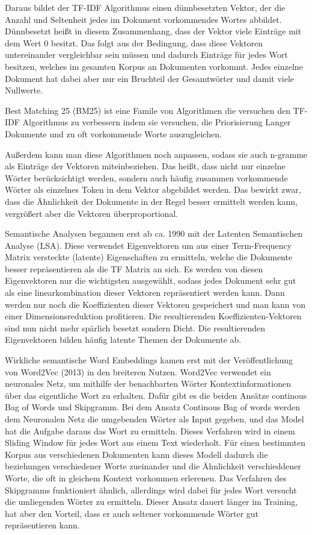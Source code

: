 Daraus bildet der TF-IDF Algorithmus einen dünnbesetzten Vektor, der die Anzahl und Seltenheit jedes im Dokument vorkommendes Wortes abbildet. 
Dünnbesetzt heißt in diesem Zusammenhang, dass der Vektor viele Einträge mit dem Wert 0 besitzt. 
Das folgt aus der Bedingung, dass diese Vektoren untereinander vergleichbar sein müssen und dadurch Einträge für jedes Wort besitzen, welches im gesamten Korpus an Dokumenten vorkommt.
Jedes einzelne Dokument hat dabei aber nur ein Bruchteil der Gesamtwörter und damit viele Nullwerte.

Best Matching 25 (BM25) ist eine Famile von Algorithmen die versuchen den TF-IDF Algorithmus zu verbessern indem sie versuchen, die Priorisierung Langer Dokumente und zu oft vorkommende Worte auszugleichen.

Außerdem kann man diese Algorithmen noch anpassen, sodass sie auch n-gramme als Einträge der Vektoren miteinbeziehen. 
Das heißt, dass nicht nur einzelne Wörter berücksichtigt werden, sondern auch häufig zusammen vorkommende Wörter als einzelnes Token in dem Vektor abgebildet werden. 
Das bewirkt zwar, dass die Ähnlichkeit der Dokumente in der Regel besser ermittelt werden kann, vergrößert aber die Vektoren überproportional.

Semantische Analysen begannen erst ab ca. 1990 mit der Latenten Semantischen Analyse (LSA).
Diese verwendet Eigenvektoren um aus einer Term-Frequency Matrix versteckte (latente) Eigenschaften zu ermitteln, welche die Dokumente besser repräsentieren als die TF Matrix an sich. 
Es werden von diesen Eigenvektoren nur die wichtigsten ausgewählt, sodass jedes Dokument sehr gut als eine linearkombination dieser Vektoren repräsentiert werden kann.
Dann werden nur noch die Koeffizienten dieser Vektoren gespeichert und man kann von einer Dimensionsreduktion profitieren.
Die resultierenden Koeffizienten-Vektoren sind nun nicht mehr spärlich besetzt sondern Dicht.
Die resultierenden Eigenvektoren bilden häufig latente Themen der Dokumente ab.

Wirkliche semantische Word Embeddings kamen erst mit der Veröffentlichung von Word2Vec (2013) in den breiteren Nutzen. 
Word2Vec verwendet ein neuronales Netz, um mithilfe der benachbarten Wörter Kontextinformationen über das eigentliche Wort zu erhalten. 
Dafür gibt es die beiden Ansätze continous Bag of Words und Skipgramm.
Bei dem Ansatz Continous Bag of words werden dem Neuronalen Netz die umgebenden Wörter als Input gegeben, und das Model hat die Aufgabe daraus das Wort zu ermitteln. 
Dieses Verfahren wird in einem Sliding Window für jedes Wort aus einem Text wiederholt. 
Für einen bestimmten Korpus aus verschiedenen Dokumenten kann dieses Modell dadurch die beziehungen verschiedener Worte zueinander und die Ähnlichkeit verschieddener Worte, die oft in gleichem Kontext vorkommen erlerenen. 
Das Verfahren des Skipgramms funktioniert ähnlich, allerdings wird dabei für jedes Wort versucht die umliegenden Wörter zu ermitteln. 
Dieser Ansatz dauert länger im Training, hat aber den Vorteil, dass er auch seltener vorkommende Wörter gut repräsentieren kann.

